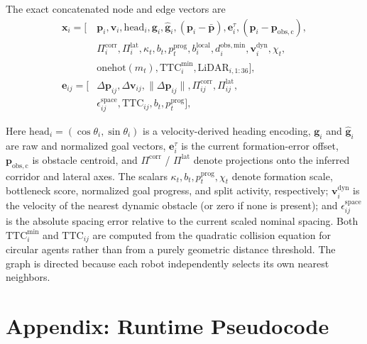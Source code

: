 \documentclass{ieeeaccess}
\newcommand{\bfp}{\mathbf{p}}
\newcommand{\bfv}{\mathbf{v}}
\newcommand{\bfe}{\mathbf{e}}
\begin{document}
The exact concatenated node and edge vectors are
\begingroup\scriptsize
\begin{equation*}
\begin{aligned}
\mathbf{x}_i = [&\bfp_i,\bfv_i,\mathrm{head}_i,\mathbf{g}_i,\hat{\mathbf{g}}_i,
(\bfp_i-\bar{\bfp}),\bfe_i^\tau,(\bfp_i-\bfp_{\mathrm{obs,c}}), \\
&\Pi_i^{\mathrm{corr}},\Pi_i^{\mathrm{lat}},
\kappa_t,b_t,p_t^{\mathrm{prog}},b_i^{\mathrm{local}},d_i^{\mathrm{obs,min}},
\bfv_i^{\mathrm{dyn}},\chi_t, \\
&\mathrm{onehot}(m_t),\mathrm{TTC}_i^{\min},
\mathrm{LiDAR}_{i,1:36}], \\
\mathbf{e}_{ij} = [&\Delta \bfp_{ij},\Delta \bfv_{ij},\|\Delta \bfp_{ij}\|,
\Pi_{ij}^{\mathrm{corr}},\Pi_{ij}^{\mathrm{lat}}, \\
&\epsilon_{ij}^{\mathrm{space}},\mathrm{TTC}_{ij},b_t,
p_t^{\mathrm{prog}}],
\end{aligned}
\end{equation*}
\endgroup

Here $\mathrm{head}_i=(\cos\theta_i,\sin\theta_i)$ is a velocity-derived
heading encoding, $\mathbf{g}_i$ and $\hat{\mathbf{g}}_i$ are raw and
normalized goal vectors, $\bfe_i^\tau$ is the current formation-error
offset, $\bfp_{\mathrm{obs,c}}$ is obstacle centroid, and
$\Pi^{\mathrm{corr}}$ / $\Pi^{\mathrm{lat}}$ denote projections onto
the inferred corridor and lateral axes. The scalars
$\kappa_t,b_t,p_t^{\mathrm{prog}},\chi_t$ denote formation scale,
bottleneck score, normalized goal progress, and split activity,
respectively; $\bfv_i^{\mathrm{dyn}}$ is the velocity of the nearest
dynamic obstacle (or zero if none is present); and
$\epsilon_{ij}^{\mathrm{space}}$ is the absolute spacing error relative
to the current scaled nominal spacing. Both $\mathrm{TTC}_i^{\min}$ and
$\mathrm{TTC}_{ij}$ are computed from the quadratic collision equation
for circular agents rather than from a purely geometric distance
threshold. The graph is directed because each robot independently
selects its own nearest neighbors.

\section*{Appendix: Runtime Pseudocode}
\end{document}
